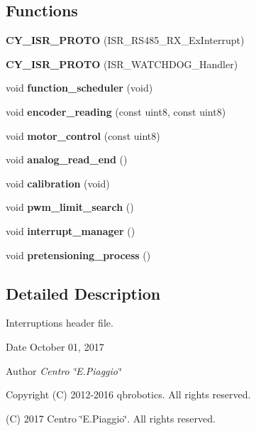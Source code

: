 \subsection*{Functions}
\begin{DoxyCompactItemize}
\item 
\mbox{\label{interruptions_8h_a7e24af8c83537b0441877bf0f00dd30a}} 
{\bfseries C\+Y\+\_\+\+I\+S\+R\+\_\+\+P\+R\+O\+TO} (I\+S\+R\+\_\+\+R\+S485\+\_\+\+R\+X\+\_\+\+Ex\+Interrupt)
\item 
\mbox{\label{interruptions_8h_a212cae8995d67d612c236fb54a4d29dc}} 
{\bfseries C\+Y\+\_\+\+I\+S\+R\+\_\+\+P\+R\+O\+TO} (I\+S\+R\+\_\+\+W\+A\+T\+C\+H\+D\+O\+G\+\_\+\+Handler)
\item 
\mbox{\label{interruptions_8h_a39df971c4e9f194be50c54dfd7aeabfe}} 
void {\bfseries function\+\_\+scheduler} (void)
\item 
\mbox{\label{interruptions_8h_a2d58475fb61b7d077e6c34ccf0499198}} 
void {\bfseries encoder\+\_\+reading} (const uint8, const uint8)
\item 
\mbox{\label{interruptions_8h_a94830a771fd71aa5b49ce0b08207985b}} 
void {\bfseries motor\+\_\+control} (const uint8)
\item 
\mbox{\label{interruptions_8h_a00a8d34962a63161405e5d7785b9625e}} 
void {\bfseries analog\+\_\+read\+\_\+end} ()
\item 
\mbox{\label{interruptions_8h_a0b6a0b24c6bd8af032a6778166201f7e}} 
void {\bfseries calibration} (void)
\item 
\mbox{\label{interruptions_8h_ab7b287cf5df2ea548297b951be2f20d4}} 
void {\bfseries pwm\+\_\+limit\+\_\+search} ()
\item 
\mbox{\label{interruptions_8h_a9790811526002d99b25a814afd02cbae}} 
void {\bfseries interrupt\+\_\+manager} ()
\item 
\mbox{\label{interruptions_8h_aca76c28737adf62dc4b7b1ef832da499}} 
void {\bfseries pretensioning\+\_\+process} ()
\end{DoxyCompactItemize}


\subsection{Detailed Description}
Interruptions header file. 

\begin{DoxyDate}{Date}
October 01, 2017 
\end{DoxyDate}
\begin{DoxyAuthor}{Author}
{\itshape Centro \char`\"{}\+E.\+Piaggio\char`\"{}} 
\end{DoxyAuthor}
\begin{DoxyCopyright}{Copyright}
(C) 2012-\/2016 qbrobotics. All rights reserved. 

(C) 2017 Centro \char`\"{}\+E.\+Piaggio\char`\"{}. All rights reserved. 
\end{DoxyCopyright}
